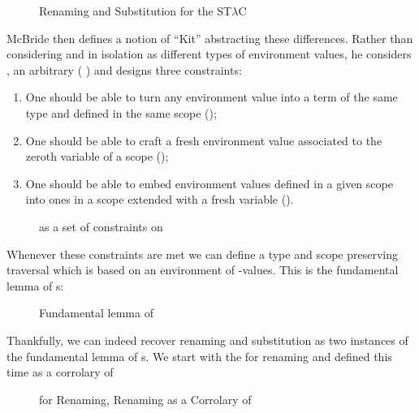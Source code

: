 \begin{figure}[h]
\caption{Renaming\label{ren} and Substitution\label{sub} for the ST$λ$C}
\end{figure}

McBride then defines a notion of ``Kit'' abstracting these differences.
Rather than considering  and  in isolation as different
types of environment values, he considers , an arbitrary
( ) and designs three constraints:

\begin{enumerate}
  \item
    One should be able to turn any environment value into a term of
    the same type and defined in the same scope ();
  \item
    One should be able to craft a fresh environment value associated
    to the zeroth variable of a scope ();
  \item
    One should be able to embed environment values defined in a given
    scope into ones in a scope extended with a fresh variable ().
\end{enumerate}

\begin{figure}[h]
\caption{ as a set of constraints on }
\end{figure}

Whenever these constraints are met we can define a type and scope preserving
traversal which is based on an environment of -values. This is the
fundamental lemma of s:

\begin{figure}[h]
\caption{Fundamental lemma of }
\end{figure}

Thankfully, we can indeed recover renaming and substitution as two instances of
the fundamental lemma of s. We start with the  for renaming
and  defined this time as a corrolary of 

\begin{figure}[h]
\begin{minipage}{0.4\textwidth}
\end{minipage}
\begin{minipage}{0.6\textwidth}
\end{minipage}
\caption{ for Renaming, Renaming as a Corrolary of \label{fig:renkit}}
\end{figure}

